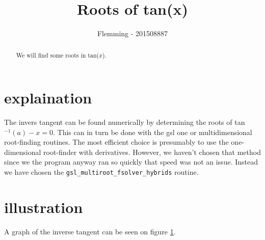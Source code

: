 \documentclass[twocolumn]{article}
\begin{document}
\title{Roots of tan(x)}
\author{Flemming - 201508887}
\date{}
\maketitle
\begin{abstract}
We will find some roots in tan($x$).
\end{abstract}

\section{explaination}

The invers tangent can be found numerically by determining the roots of tan$^{-1}(a)-x=0$. 
This can in turn be done with the gsl one or multidimensional root-finding routines. 
The most efficient choice is presumably to use the one-dimensional root-finder with derivatives. 
However, we haven't chosen that method since we the program anyway ran so quickly that speed was not an issue.
Instead we have chosen the \texttt{gsl\_multiroot\_fsolver\_hybrids} routine.

\section{illustration}
A graph of the inverse tangent can be seen on figure \ref{plot}.

\begin{figure}[h!]

\label{plot}
\end{figure}
\end{document}
